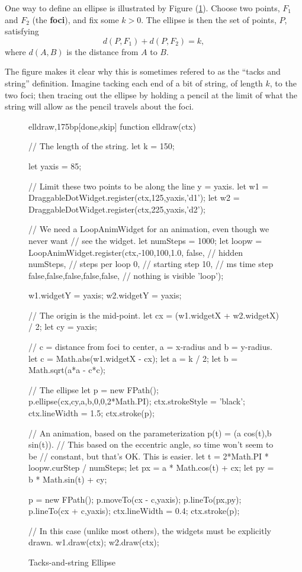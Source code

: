 \documentclass[10pt]{article}
\begin{document}
One way to define an ellipse is illustrated by Figure
(\ref{fig-ellipse-draw}). Choose two points, $F_1$ and $F_2$ (the
{\bf foci}), and fix some $k>0$. The ellipse is then
the set of points, $P$, satisfying
$$d(P,F_1) + d(P,F_2) = k,$$
where $d(A,B)$ is the distance from $A$ to $B$.

The figure makes it clear why this is sometimes refered to as the
``tacks and string'' definition. Imagine tacking each end of a bit of
string, of length $k$, to the two foci; then tracing out the ellipse
by holding a pencil at the limit of what the string will allow as the
pencil travels about the foci. 

\begin{figure}
\begin{figput}{elldraw,175bp}[done,skip]
  function elldraw(ctx) {

  // The length of the string.
  let k = 150;
  
  let yaxis = 85;
  
  // Limit these two points to be along the line y = yaxis.
  let w1 = DraggableDotWidget.register(ctx,125,yaxis,'d1');
  let w2 = DraggableDotWidget.register(ctx,225,yaxis,'d2');

  // We need a LoopAnimWidget for an animation, even though we never want
  // see the widget.
  let numSteps = 1000;
  let loopw = LoopAnimWidget.register(ctx,-100,100,1.0,
  false, // hidden
  numSteps, // steps per loop
  0, // starting step
  10, // ms time step
  false,false,false,false,false, // nothing is visible
  'loop');

  w1.widgetY = yaxis;
  w2.widgetY = yaxis;
  
  // The origin is the mid-point.
  let cx = (w1.widgetX + w2.widgetX) / 2;
  let cy = yaxis;

  // c = distance from foci to center, a = x-radius and b = y-radius.
  let c = Math.abs(w1.widgetX - cx);
  let a = k / 2;
  let b = Math.sqrt(a*a - c*c);

  // The ellipse
  let p = new FPath();
  p.ellipse(cx,cy,a,b,0,0,2*Math.PI);
  ctx.strokeStyle = 'black';
  ctx.lineWidth = 1.5;
  ctx.stroke(p);

  // An animation, based on the parameterization p(t) = (a cos(t),b sin(t)).
  // This based on the eccentric angle, so time won't seem to be
  // constant, but that's OK. This is easier.
  let t = 2*Math.PI * loopw.curStep / numSteps;
  let px = a * Math.cos(t) + cx;
  let py = b * Math.sin(t) + cy;

  p = new FPath();
  p.moveTo(cx - c,yaxis);
  p.lineTo(px,py);
  p.lineTo(cx + c,yaxis);
  ctx.lineWidth = 0.4;
  ctx.stroke(p);
  
  // In this case (unlike most others), the widgets must be explicitly drawn.
  w1.draw(ctx);
  w2.draw(ctx);
}    
\end{figput}
\caption{Tacks-and-string Ellipse}
\label{fig-ellipse-draw}
\end{figure}
\end{document}
